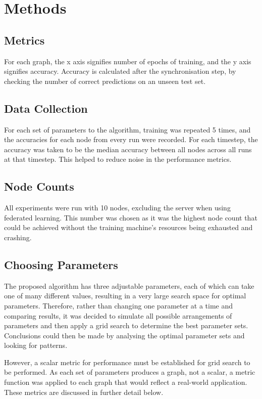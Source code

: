 \section{Methods}
\subsection{Metrics}
For each graph, the x axis signifies number of epochs of training, and the y axis signifies accuracy. Accuracy is calculated after the synchronisation step, by checking the number of correct predictions on an unseen test set.

\subsection{Data Collection}
For each set of parameters to the algorithm, training was repeated 5 times, and the accuracies for each node from every run were recorded. For each timestep, the accuracy was taken to be the median accuracy between all nodes across all runs at that timestep. This helped to reduce noise in the performance metrics.

\subsection{Node Counts}
All experiments were run with 10 nodes, excluding the server when using federated learning. This number was chosen as it was the highest node count that could be achieved without the training machine's resources being exhausted and crashing.

\subsection{Choosing Parameters}
The proposed algorithm has three adjustable parameters, each of which can take one of many different values, resulting in a very large search space for optimal parameters. Therefore, rather than changing one parameter at a time and comparing results, it was decided to simulate all possible arrangements of parameters and then apply a grid search to determine the best parameter sets. Conclusions could then be made by analysing the optimal parameter sets and looking for patterns.

However, a scalar metric for performance must be established for grid search to be performed. As each set of parameters produces a graph, not a scalar, a metric function was applied to each graph that would reflect a real-world application. These metrics are discussed in further detail below.

